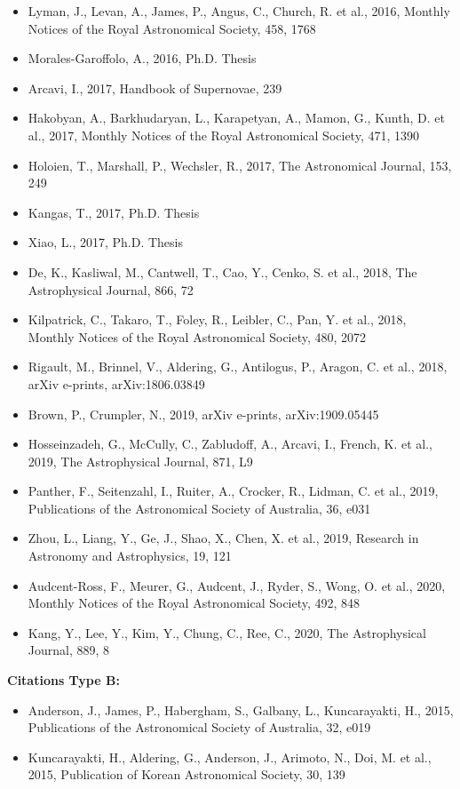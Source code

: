 \documentclass{letter}
\begin{document}
\begin{enumerate}
\begin{itemize}
\item Lyman, J., Levan, A., James, P., Angus, C., Church, R. et al., 2016, Monthly Notices of the Royal Astronomical Society, 458, 1768
\item Morales-Garoffolo, A., 2016, Ph.D. Thesis
\item Arcavi, I., 2017, Handbook of Supernovae, 239
\item Hakobyan, A., Barkhudaryan, L., Karapetyan, A., Mamon, G., Kunth, D. et al., 2017, Monthly Notices of the Royal Astronomical Society, 471, 1390
\item Holoien, T., Marshall, P., Wechsler, R., 2017, The Astronomical Journal, 153, 249
\item Kangas, T., 2017, Ph.D. Thesis
\item Xiao, L., 2017, Ph.D. Thesis
\item De, K., Kasliwal, M., Cantwell, T., Cao, Y., Cenko, S. et al., 2018, The Astrophysical Journal, 866, 72
\item Kilpatrick, C., Takaro, T., Foley, R., Leibler, C., Pan, Y. et al., 2018, Monthly Notices of the Royal Astronomical Society, 480, 2072
\item Rigault, M., Brinnel, V., Aldering, G., Antilogus, P., Aragon, C. et al., 2018, arXiv e-prints, arXiv:1806.03849
\item Brown, P., Crumpler, N., 2019, arXiv e-prints, arXiv:1909.05445
\item Hosseinzadeh, G., McCully, C., Zabludoff, A., Arcavi, I., French, K. et al., 2019, The Astrophysical Journal, 871, L9
\item Panther, F., Seitenzahl, I., Ruiter, A., Crocker, R., Lidman, C. et al., 2019, Publications of the Astronomical Society of Australia, 36, e031
\item Zhou, L., Liang, Y., Ge, J., Shao, X., Chen, X. et al., 2019, Research in Astronomy and Astrophysics, 19, 121
\item Audcent-Ross, F., Meurer, G., Audcent, J., Ryder, S., Wong, O. et al., 2020, Monthly Notices of the Royal Astronomical Society, 492, 848
\item Kang, Y., Lee, Y., Kim, Y., Chung, C., Ree, C., 2020, The Astrophysical Journal, 889, 8
\end{itemize}
{\bf Citations Type B:}
\begin{itemize}
\item Anderson, J., James, P., Habergham, S., Galbany, L., Kuncarayakti, H., 2015, Publications of the Astronomical Society of Australia, 32, e019
\item Kuncarayakti, H., Aldering, G., Anderson, J., Arimoto, N., Doi, M. et al., 2015, Publication of Korean Astronomical Society, 30, 139

\end{itemize}
\end{enumerate}
\end{document}
